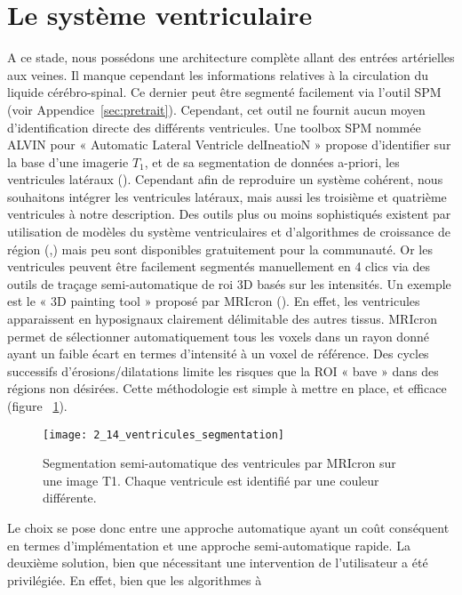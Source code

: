 \section{Le système ventriculaire}
\label{sec:syst_ventr}
A ce stade, nous possédons une architecture complète allant des entrées artérielles aux veines. Il manque cependant les informations relatives à la circulation du liquide cérébro-spinal. Ce dernier peut être segmenté facilement via l’outil SPM (voir Appendice~\ref{sec:pretrait}). Cependant, cet outil ne fournit aucun moyen d’identification directe des différents ventricules. Une toolbox SPM nommée ALVIN pour « Automatic Lateral Ventricle delIneatioN » propose d’identifier sur la base d’une imagerie $T_1$, et de sa segmentation de données a-priori, les ventricules latéraux (\cite{Kempton2011}). Cependant afin de reproduire un système cohérent, nous souhaitons intégrer les ventricules latéraux, mais aussi les troisième et quatrième ventricules à notre description. Des outils plus ou moins sophistiqués existent par utilisation de modèles du système ventriculaires et d’algorithmes de croissance de région  (\cite{Liu2009},\cite{Schnack2001}) mais peu sont disponibles gratuitement pour la communauté. Or les ventricules peuvent être facilement segmentés manuellement en 4 clics via des outils de traçage semi-automatique de roi 3D basés sur les intensités. Un exemple est le « 3D painting tool » proposé par MRIcron (\cite{Rorden2007}). En effet, les ventricules apparaissent en hyposignaux clairement délimitable des autres tissus. MRIcron permet de sélectionner automatiquement tous les voxels dans un rayon donné ayant un faible écart en termes d’intensité à un voxel de référence. Des cycles successifs d’érosions/dilatations limite les risques que la ROI « bave » dans des régions non désirées. Cette méthodologie est simple à mettre en place, et efficace (figure ~\ref{fig:2_14_ventricules_segmentes}). \\
\begin{figure}[!t]
\centering
\texttt{[image: 2\_14\_ventricules\_segmentation]}
\caption{Segmentation semi-automatique des ventricules par MRIcron sur une image T1. Chaque ventricule est identifié
par une couleur différente.}
\label{fig:2_14_ventricules_segmentes}	
\end{figure}	
Le choix se pose donc entre une approche automatique ayant un coût conséquent en termes
d’implémentation et une approche semi-automatique rapide. La deuxième solution, bien que
nécessitant une intervention de l’utilisateur a été privilégiée. En effet, bien que les algorithmes à
